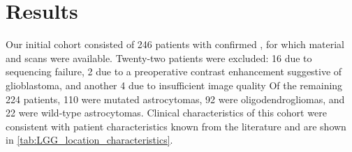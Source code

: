 \section{Results}

Our initial cohort consisted of 246 patients with confirmed , for which  material and  scans were available.
Twenty-two patients were excluded: 16 due to sequencing failure, 2 due to a preoperative contrast enhancement suggestive of glioblastoma, and another 4 due to insufficient image quality
Of the remaining 224 patients, 110 were  mutated astrocytomas, 92 were oligodendrogliomas, and 22 were  wild-type astrocytomas.
Clinical characteristics of this cohort were consistent with  patient characteristics known from the literature and are shown in \cref{tab:LGG_location_characteristics}.

